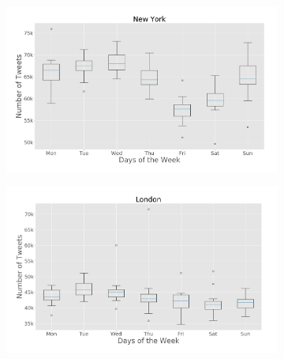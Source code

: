 \begin{figure}[htbp]
    \begin{subfigure}[htbp]{0.45\textwidth}
        \centering
        \includegraphics[width=1\linewidth]{figures/nyc_box_plt_day_of_week.png}
        \caption{}
        \label{subfig:newyork_box_plot_day_of_week}
    \end{subfigure}
    \quad
    \begin{subfigure}[htbp]{0.45\textwidth}
        \centering
        \includegraphics[width=1\linewidth]{figures/london_box_plt_day_of_week.png}
        \caption{}
        \label{subfig:london_box_plot_day_of_week}
    \end{subfigure}

	\medskip
    

\end{figure}
